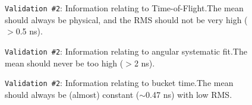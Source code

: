 \documentclass[12pt]{article}
\begin{document}
\begin{figure}
\centering
\noindent{}
  \caption{\centering \texttt{Validation \#2}: Information relating to Time-of-Flight.\hspace{\textwidth}The mean should always be physical, and the RMS should not be very high ($>$0.5 ns).}
  \label{fig:val20}
\end{figure}

\begin{figure}
\centering
\noindent{}
  \caption{\centering \texttt{Validation \#2}: Information relating to angular systematic fit.\hspace{\textwidth}The mean should never be too high ($>$2 ns).}
  \label{fig:val21}
\end{figure}

\begin{figure}
\centering
\noindent{}
  \caption{\centering \texttt{Validation \#2}: Information relating to bucket time.\hspace{\textwidth}The mean should always be (almost) constant ($\sim$0.47 ns) with low RMS. }
  \label{fig:val22}
\end{figure}
\end{document}
